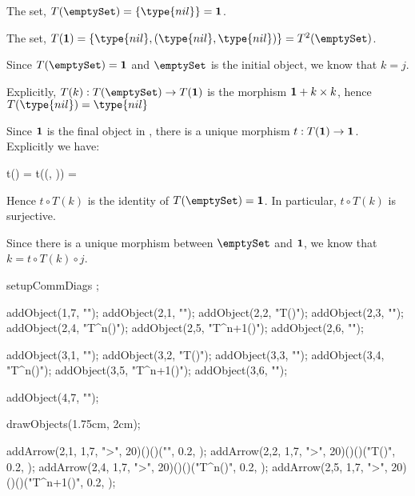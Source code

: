 \item The set, $T(\emptySet) = \{ \type{nil} \} = \bold{1}$.

\item The set, $T(\bold{1}) = \{ \type{nil}, (\type{nil}, \type{nil}) \} = 
T^2(\emptySet)$. 

\item Since $T(\emptySet) = \bold{1}$ and $\emptySet$ is the initial 
object, we know that $k = j$. 

\item Explicitly, $T(k) : T(\emptySet) \rightarrow T(\bold{1})$ is the 
morphism $\bold{1} + k \times k$, hence $T(\type{nil}) = \type{nil}$ 

\item Since $\bold{1}$ is the final object in \Set, there is a unique 
morphism $t: T(\bold{1}) \rightarrow \bold{1}$. Explicitly we have:

\startformula\startalign
  \NC t()               \NC =  \NR
  \NC t((, )) \NC =  \NR
\stopalign\stopformula

\noindent Hence $t \circ T(k)$ is the identity of $T(\emptySet) = 
\bold{1}$. In particular, $t \circ T(k)$ is surjective.

\item Since there is a unique morphism between $\emptySet$ and $\bold{1}$, 
we know that $k = t \circ T(k) \circ j$. 

\item {}

\stopitemize
\placeformula[left]\startformula {}
  setupCommDiags ; 
  
  addObject(1,7, "\wflol");
  addObject(2,1, "\emptySet");
  addObject(2,2, "T(\emptySet)");
  addObject(2,3, "\cdots");
  addObject(2,4, "T^n(\emptySet)");
  addObject(2,5, "T^{n+1}(\emptySet)");
  addObject(2,6, "\cdots");
  
  addObject(3,1, "");
  addObject(3,2, "T()");
  addObject(3,3, "\cdots");
  addObject(3,4, "T^n()");
  addObject(3,5, "T^{n+1}()");
  addObject(3,6, "\cdots");
  
  addObject(4,7, "\lol");

  drawObjects(1.75cm, 2cm);

  addArrow(2,1, 1,7, ">", 20)()()("",          0.2, );
  addArrow(2,2, 1,7, ">", 20)()()("T()",       0.2, );
  addArrow(2,4, 1,7, ">", 20)()()("T^n()",     0.2, );
  addArrow(2,5, 1,7, ">", 20)()()("T^{n+1}()", 0.2, );
  
